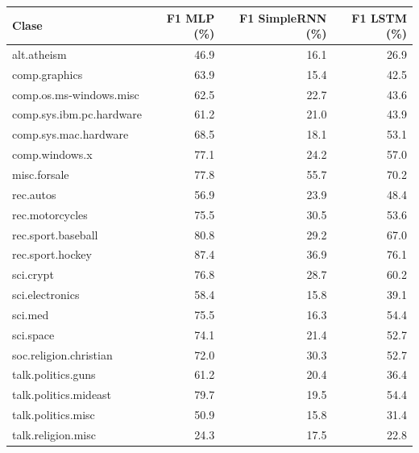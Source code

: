 \begin{tabular}{lrrr}
\toprule
Clase & F1 MLP (\%) & F1 SimpleRNN (\%) & F1 LSTM (\%) \\
\midrule
alt.atheism & 46.9 & 16.1 & 26.9 \\
comp.graphics & 63.9 & 15.4 & 42.5 \\
comp.os.ms-windows.misc & 62.5 & 22.7 & 43.6 \\
comp.sys.ibm.pc.hardware & 61.2 & 21.0 & 43.9 \\
comp.sys.mac.hardware & 68.5 & 18.1 & 53.1 \\
comp.windows.x & 77.1 & 24.2 & 57.0 \\
misc.forsale & 77.8 & 55.7 & 70.2 \\
rec.autos & 56.9 & 23.9 & 48.4 \\
rec.motorcycles & 75.5 & 30.5 & 53.6 \\
rec.sport.baseball & 80.8 & 29.2 & 67.0 \\
rec.sport.hockey & 87.4 & 36.9 & 76.1 \\
sci.crypt & 76.8 & 28.7 & 60.2 \\
sci.electronics & 58.4 & 15.8 & 39.1 \\
sci.med & 75.5 & 16.3 & 54.4 \\
sci.space & 74.1 & 21.4 & 52.7 \\
soc.religion.christian & 72.0 & 30.3 & 52.7 \\
talk.politics.guns & 61.2 & 20.4 & 36.4 \\
talk.politics.mideast & 79.7 & 19.5 & 54.4 \\
talk.politics.misc & 50.9 & 15.8 & 31.4 \\
talk.religion.misc & 24.3 & 17.5 & 22.8 \\
\bottomrule
\end{tabular}

